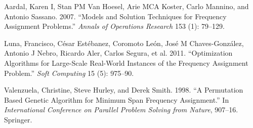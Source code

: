 \documentclass[
  11pt,
  a4paper,
]{article}
\newlength{\cslhangindent}
\newenvironment{CSLReferences}[2] %
 {\begin{list}{}{%
  \setlength{\itemindent}{0pt}
  \setlength{\leftmargin}{0pt}
  \setlength{\parsep}{0pt}
  \ifodd #1
   \setlength{\leftmargin}{\cslhangindent}
   \setlength{\itemindent}{-1\cslhangindent}
  \fi
  \setlength{\itemsep}{#2\baselineskip}}}
 {\end{list}}
\begin{document}
\label{refs}
\begin{CSLReferences}{1}{0}
Aardal, Karen I, Stan PM Van Hoesel, Arie MCA Koster, Carlo Mannino, and Antonio Sassano. 2007. {``Models and Solution Techniques for Frequency Assignment Problems.''} \emph{Annals of Operations Research} 153 (1): 79--129.

Luna, Francisco, César Estébanez, Coromoto León, José M Chaves-González, Antonio J Nebro, Ricardo Aler, Carlos Segura, et al. 2011. {``Optimization Algorithms for Large-Scale Real-World Instances of the Frequency Assignment Problem.''} \emph{Soft Computing} 15 (5): 975--90.

Valenzuela, Christine, Steve Hurley, and Derek Smith. 1998. {``A Permutation Based Genetic Algorithm for Minimum Span Frequency Assignment.''} In \emph{International Conference on Parallel Problem Solving from Nature}, 907--16. Springer.

\end{CSLReferences}
\end{document}
